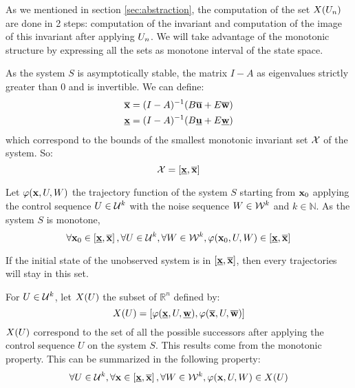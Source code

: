 As we mentioned in section \ref{sec:abstraction}, the computation of the set $X(U_n)$ are done in 2 steps: computation of the invariant and computation of the image of this invariant after applying $U_n$.
We will take advantage of the monotonic structure by expressing all the sets as monotone interval of the state space.

As the system $S$ is asymptotically stable, the matrix $I-A$ as eigenvalues strictly greater than $0$ and is invertible.
We can define:
\begin{equation}
\begin{split}
\overline{ \mathbf{x}} &= (I-A)^{-1} (B \overline{ \mathbf{u}} + E \overline{ \mathbf{w}})\\
\underline{ \mathbf{x}} &= (I-A)^{-1} (B \underline{ \mathbf{u}} + E \underline{ \mathbf{w}})\\
\end{split}
\end{equation}
which correspond to the bounds of the smallest monotonic invariant set $\mathcal{X}$ of the system.
So:
\begin{equation}
\mathcal{X} = \left[ \underline{ \mathbf{x}}, \overline{ \mathbf{x}} \right]
\end{equation}

Let $\varphi( \mathbf{x},U,W)$ the trajectory function of the system $S$ starting from $ \mathbf{x}_0$
applying the control sequence $U \in {\mathcal{U}}^k$
with the noise sequence $W \in {\mathcal{W}}^k$ and $k \in \mathbb{N}$.
As the system $S$ is monotone,
\begin{equation}
\forall  \mathbf{x}_0 \in \left [\underline{ \mathbf{x}}, \overline{ \mathbf{x}} \right ],
\forall U \in {\mathcal{U}}^k,
\forall W \in {\mathcal{W}}^k,
\varphi ( \mathbf{x}_0,U,W)
\in \left[ \underline{ \mathbf{x}}, \overline{ \mathbf{x}} \right]
\end{equation}

If the initial state of the unobserved system is in $\left[ \underline{ \mathbf{x}}, \overline{ \mathbf{x}} \right]$, then every trajectories will stay in this set.

For $U \in \mathcal{U}^k$, let $X(U)$ the subset of $\mathbb{R}^n$ defined by:
\begin{equation}
X(U) = \left[ 
\varphi (\underline{ \mathbf{x}},U,\underline{ \mathbf{w}}),
\varphi (\overline{ \mathbf{x}},U,\overline{ \mathbf{w}})
\right]
\end{equation}
$X(U)$ correspond to the set of all the possible successors after applying the control sequence $U$ on the system $S$. This results come from the monotonic property.
This can be summarized in the following property:
\begin{equation}
\forall U \in \mathcal{U}^k,
\forall  \mathbf{x} \in \left[\underline{ \mathbf{x}}, \overline{ \mathbf{x}} \right],
\forall W \in \mathcal{W}^k,
\varphi ( \mathbf{x},U,W) \in X(U)
\end{equation}

